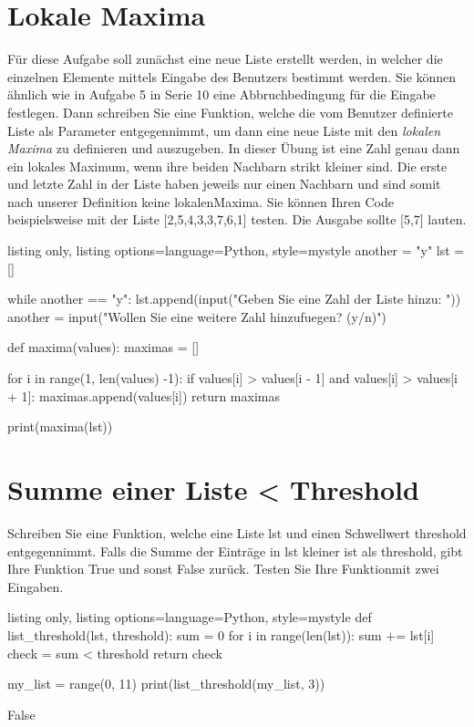 \documentclass[11pt, oneside]{book}
\begin{document}
\section{Lokale Maxima}
F\"ur diese Aufgabe soll zunächst eine neue Liste erstellt werden, in welcher die einzelnen Elemente mittels Eingabe des Benutzers bestimmt werden. Sie können ähnlich wie in Aufgabe 5 in Serie 10 eine Abbruchbedingung f\"ur die Eingabe festlegen. Dann schreiben Sie eine Funktion, welche die vom Benutzer definierte Liste als Parameter entgegennimmt, um dann eine neue Liste mit den \textit{lokalen Maxima} zu definieren und auszugeben. In dieser Übung ist eine Zahl genau dann ein lokales Maximum, wenn ihre beiden Nachbarn strikt kleiner sind. Die erste und letzte Zahl in der Liste haben jeweils nur einen Nachbarn und sind somit nach unserer Definition keine lokalenMaxima. Sie können Ihren Code beispielsweise mit der Liste [2,5,4,3,3,7,6,1] testen. Die Ausgabe sollte [5,7] lauten.
\begin{tcblisting}{listing only, listing options={language=Python, style=mystyle}}
another = "y"
lst = []

while another == "y":
    lst.append(input("Geben Sie eine Zahl der Liste hinzu: "))
    another = input("Wollen Sie eine weitere Zahl hinzufuegen? (y/n)")

def maxima(values):
    maximas = []

    for i in range(1, len(values) -1): 
        if values[i] > values[i - 1] and values[i] > values[i + 1]:
            maximas.append(values[i])
    return maximas

print(maxima(lst))
\end{tcblisting}

\newpage

\section{Summe einer Liste < Threshold}
Schreiben Sie eine Funktion, welche eine Liste lst und einen Schwellwert threshold entgegennimmt.
Falls die Summe der Einträge in lst kleiner ist als threshold, gibt Ihre Funktion
True und sonst False zur\"uck. Testen Sie Ihre Funktionmit zwei Eingaben.
\begin{tcblisting}{listing only, listing options={language=Python, style=mystyle}}
def list_threshold(lst, threshold):
    sum = 0
    for i in range(len(lst)):
        sum += lst[i]
    check = sum < threshold
    return check

my_list = range(0, 11)
print(list_threshold(my_list, 3))

False

\end{tcblisting}
\end{document}
